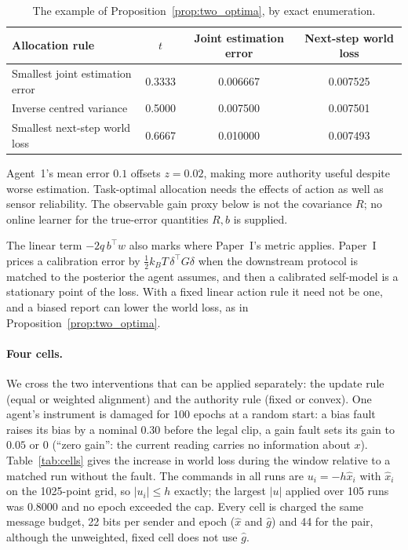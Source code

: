 \documentclass[12pt]{article}
\theoremstyle{definition}
\begin{document}
\begin{table}[htbp]
\centering
\begin{tabular}{lccc}
\hline
Allocation rule & $t$ & Joint estimation error & Next-step world loss \\
\hline
Smallest joint estimation error & 0.3333 & 0.006667 & 0.007525 \\
Inverse centred variance & 0.5000 & 0.007500 & 0.007501 \\
Smallest next-step world loss & 0.6667 & 0.010000 & 0.007493 \\
\hline
\end{tabular}
\caption{The example of Proposition~\ref{prop:two_optima}, by exact enumeration.}
\label{tab:two_optima}
\end{table}

Agent~1's mean error $0.1$ offsets $z=0.02$, making more authority useful despite worse estimation. Task-optimal allocation needs the effects of action as well as sensor reliability. The observable gain proxy below is not the covariance $R$; no online learner for the true-error quantities $R,b$ is supplied.

The linear term $-2q\,b^{\top}w$ also marks where Paper~I's metric applies. Paper~I prices a calibration error by $\tfrac12k_BT\,\delta^{\top}G\delta$ when the downstream protocol is matched to the posterior the agent assumes, and then a calibrated self-model is a stationary point of the loss. With a fixed linear action rule it need not be one, and a biased report can lower the world loss, as in Proposition~\ref{prop:two_optima}.

\paragraph{Four cells.} We cross the two interventions that can be applied separately: the update rule (equal or weighted alignment) and the authority rule (fixed or convex). One agent's instrument is damaged for 100 epochs at a random start: a bias fault raises its bias by a nominal $0.30$ before the legal clip, a gain fault sets its gain to $0.05$ or $0$ (``zero gain'': the current reading carries no information about $x$). Table~\ref{tab:cells} gives the increase in world loss during the window relative to a matched run without the fault. The commands in all runs are $u_i=-h\hat x_i$ with $\hat x_i$ on the 1025-point grid, so $|u_i|\le h$ exactly; the largest $|u|$ applied over 105 runs was 0.8000 and no epoch exceeded the cap. Every cell is charged the same message budget, 22 bits per sender and epoch ($\hat x$ and $\hat g$) and 44 for the pair, although the unweighted, fixed cell does not use $\hat g$.
\end{document}
